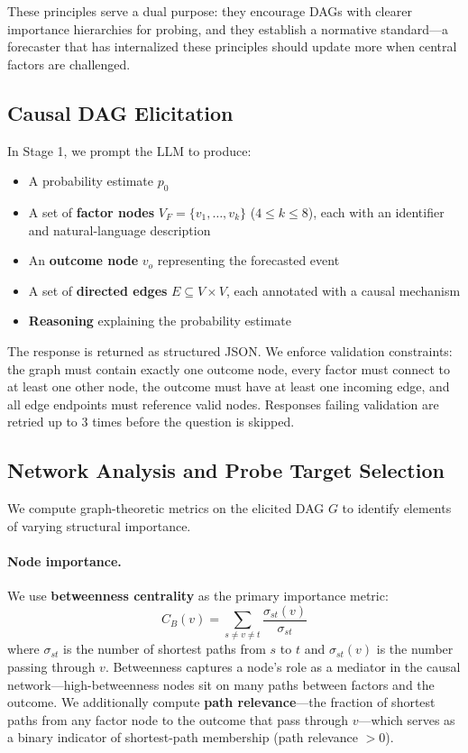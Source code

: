 \documentclass[11pt]{article}
\begin{document}
These principles serve a dual purpose: they encourage DAGs with clearer importance hierarchies for probing, and they establish a normative standard---a forecaster that has internalized these principles should update more when central factors are challenged.

\subsection{Causal DAG Elicitation}
\label{sec:dag}

In Stage 1, we prompt the LLM to produce:
\begin{itemize}
    \item A probability estimate $p_0$
    \item A set of \textbf{factor nodes} $V_F = \{v_1, \ldots, v_k\}$ ($4 \leq k \leq 8$), each with an identifier and natural-language description
    \item An \textbf{outcome node} $v_o$ representing the forecasted event
    \item A set of \textbf{directed edges} $E \subseteq V \times V$, each annotated with a causal mechanism
    \item \textbf{Reasoning} explaining the probability estimate
\end{itemize}

The response is returned as structured JSON. We enforce validation constraints: the graph must contain exactly one outcome node, every factor must connect to at least one other node, the outcome must have at least one incoming edge, and all edge endpoints must reference valid nodes. Responses failing validation are retried up to 3 times before the question is skipped.

\subsection{Network Analysis and Probe Target Selection}
\label{sec:network}

We compute graph-theoretic metrics on the elicited DAG $G$ to identify elements of varying structural importance.

\paragraph{Node importance.} We use \textbf{betweenness centrality} as the primary importance metric:
\begin{equation}
    C_B(v) = \sum_{s \neq v \neq t} \frac{\sigma_{st}(v)}{\sigma_{st}}
\end{equation}
where $\sigma_{st}$ is the number of shortest paths from $s$ to $t$ and $\sigma_{st}(v)$ is the number passing through $v$. Betweenness captures a node's role as a mediator in the causal network---high-betweenness nodes sit on many paths between factors and the outcome. We additionally compute \textbf{path relevance}---the fraction of shortest paths from any factor node to the outcome that pass through $v$---which serves as a binary indicator of shortest-path membership (path relevance $> 0$).
\end{document}
